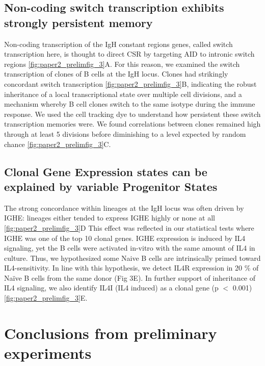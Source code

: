 \subsection{Non-coding switch transcription exhibits strongly persistent memory}

Non-coding transcription of the IgH constant regions genes, called switch transcription here, is thought to direct CSR by targeting AID to intronic switch regions \ref{fig:paper2_prelimfig_3}A\cite{stavnezer_igh_2014}. For this reason, we examined the switch transcription of clones of B cells at the IgH locus. Clones had strikingly concordant switch transcription \ref{fig:paper2_prelimfig_3}B, indicating the robust inheritance of a local transcriptional state over multiple cell divisions, and a mechanism whereby B cell clones switch to the same isotype during the immune response. We used the cell tracking dye to understand how persistent these switch transcription memories were. We found correlations between clones remained high through at least 5 divisions before diminishing to a level expected by random chance \ref{fig:paper2_prelimfig_3}C.

\subsection{Clonal Gene Expression states can be explained by variable Progenitor States}
The strong concordance within lineages at the IgH locus was often driven by IGHE: lineages either tended to express IGHE highly or none at all \ref{fig:paper2_prelimfig_3}D This effect was reflected in our statistical tests where IGHE was one of the top 10 clonal genes. IGHE expression is induced by IL4 signaling, yet the B cells were activated in-vitro with the same amount of IL4 in culture. Thus, we hypothesized some Naive B cells are intrinsically primed toward IL4-sensitivity. In line with this hypothesis, we detect IL4R expression in 20 \% of Naïve B cells from the same donor (Fig 3E). In further support of inheritance of IL4 signaling, we also identify IL4I (IL4 induced) as a clonal gene (p $<$ 0.001) \ref{fig:paper2_prelimfig_3}E. 
\section{Conclusions from preliminary experiments}

